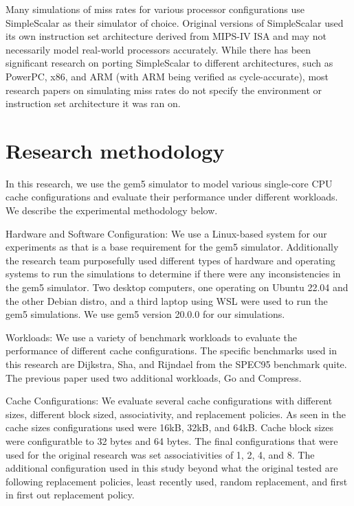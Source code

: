 \documentclass[conference]{IEEEtran}
\begin{document}

Many simulations of miss rates for various processor configurations use SimpleScalar\cite{10.1145/268806.268810} as their simulator of choice. Original versions of SimpleScalar used its own instruction set architecture derived from MIPS-IV ISA\cite{10.1145/268806.268810} and may not necessarily model real-world processors accurately. While there has been significant research on porting SimpleScalar to different architectures, such as PowerPC, x86, and ARM\cite{10.1145/986537.986601} (with ARM being verified as cycle-accurate\cite{CHUNG2006137}), most research papers on simulating miss rates do not specify the environment or instruction set architecture it was ran on.

\section{Research methodology}
In this research, we use the gem5 simulator to model various single-core CPU cache configurations and evaluate their performance under different workloads. We describe the experimental methodology below.

Hardware and Software Configuration:
We use a Linux-based system for our experiments as that is a base requirement for the gem5 simulator. Additionally the research team purposefully used different types of hardware and operating systems to run the simulations to determine if there were any inconsistencies in the gem5 simulator. Two desktop computers, one operating on Ubuntu 22.04 and the other Debian distro, and a third laptop using WSL were used to run the gem5 simulations. We use gem5 version 20.0.0 for our simulations.

Workloads:
We use a variety of benchmark workloads to evaluate the performance of different cache configurations. The specific benchmarks used in this research are Dijkstra, Sha, and Rijndael from the SPEC95 benchmark quite. The previous paper used two additional workloads, Go and Compress.

Cache Configurations:
We evaluate several cache configurations with different sizes, different block sized, associativity, and replacement policies. As seen in the cache sizes configurations used were 16kB, 32kB, and 64kB. Cache block sizes were configuratble to 32 bytes and 64 bytes. The final configurations that were used for the original research was set associativities of 1, 2, 4, and 8. The additional configuration used in this study beyond what the original tested are following replacement policies, least recently used, random replacement, and first in first out replacement policy.
\end{document}
